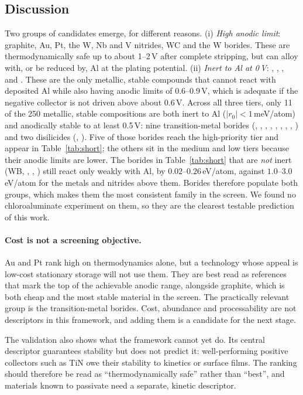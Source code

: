 \documentclass{report}
\begin{document}
\subsection{Discussion}
Two groups of candidates emerge, for different reasons. (i) \emph{High anodic limit}: graphite, Au, Pt, the W, Nb and V nitrides, WC and the W borides. These are thermodynamically safe up to about 1--2\,V after complete stripping, but can alloy with, or be reduced by, Al at the plating potential. (ii) \emph{Inert to Al at 0\,V}: , , ,  and . These are the only metallic, stable compounds that cannot react with deposited Al while also having anodic limits of 0.6--0.9\,V, which is adequate if the negative collector is not driven above about 0.6\,V. Across all three tiers, only 11 of the 250 metallic, stable compositions are both inert to Al ($|r_0| < 1$\,meV/atom) and anodically stable to at least 0.5\,V: nine transition-metal borides (, , , , , , , , ) and two disilicides (, ). Five of those borides reach the high-priority tier and appear in Table~\ref{tab:short}; the others sit in the medium and low tiers because their anodic limits are lower. The borides in Table~\ref{tab:short} that are \emph{not} inert (WB, , , ) still react only weakly with Al, by $0.02$--$0.26$\,eV/atom, against $1.0$--$3.0$\,eV/atom for the metals and nitrides above them. Borides therefore populate both groups, which makes them the most consistent family in the screen. We found no chloroaluminate experiment on them, so they are the clearest testable prediction of this work.

\paragraph{Cost is not a screening objective.} Au and Pt rank high on thermodynamics alone, but a technology whose appeal is low-cost stationary storage will not use them. They are best read as references that mark the top of the achievable anodic range, alongside graphite, which is both cheap and the most stable material in the screen. The practically relevant group is the transition-metal borides. Cost, abundance and processability are not descriptors in this framework, and adding them is a candidate for the next stage.

The validation also shows what the framework cannot yet do. Its central descriptor guarantees stability but does not predict it: well-performing positive collectors such as TiN owe their stability to kinetics or surface films. The ranking should therefore be read as ``thermodynamically safe'' rather than ``best'', and materials known to passivate need a separate, kinetic descriptor.
\end{document}
